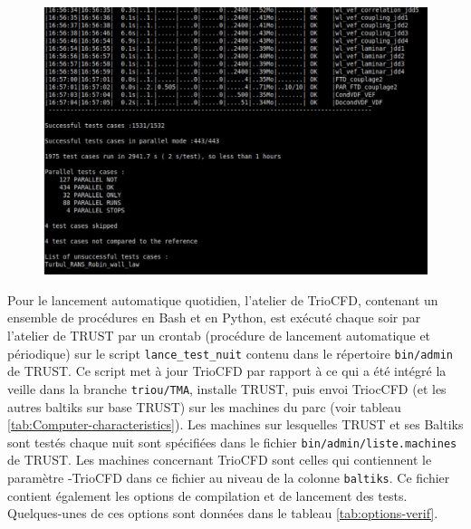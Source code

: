 \begin{figure}[H]
   \centering
   \includegraphics[width=16cm]{pictures/verif-resultats.png}
   \vspace*{0.2cm}
\end{figure}


Pour le lancement automatique quotidien, l'atelier de TrioCFD, contenant un ensemble de procédures en Bash et en Python, est exécuté chaque soir par l'atelier de TRUST par un crontab (procédure de lancement automatique et périodique) sur le script \texttt{lance\_test\_nuit} contenu dans le répertoire \texttt{bin/admin} de TRUST. Ce script met à jour TrioCFD par rapport à ce qui a été intégré la veille dans la branche \texttt{triou/TMA}, installe TRUST, puis envoi TriocCFD (et les autres baltiks sur base TRUST) sur les machines du parc (voir tableau \ref{tab:Computer-characteristics}).
Les machines sur lesquelles TRUST et ses Baltiks sont testés chaque nuit sont spécifiées dans le fichier \texttt{bin/admin/liste.machines} de TRUST. Les machines concernant TrioCFD sont celles qui contiennent le paramètre -TrioCFD dans ce fichier au niveau de la colonne \texttt{baltiks}. Ce fichier contient également les options de compilation et de lancement des tests. Quelques-unes de ces options sont données dans le tableau \ref{tab:options-verif}.

